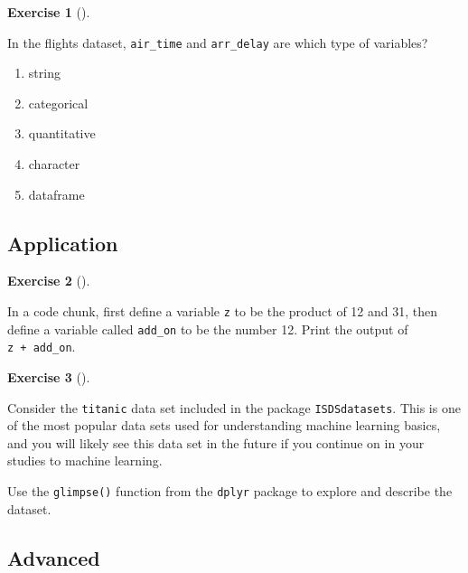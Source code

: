 \documentclass[
  letterpaper,
  DIV=11,
  numbers=noendperiod]{scrreprt}
\providecommand{\tightlist}{%
  \setlength{\itemsep}{0pt}\setlength{\parskip}{0pt}}\usepackage{longtable,booktabs,array}
\theoremstyle{definition}
\newtheorem{exercise}{Exercise}[chapter]
\theoremstyle{remark}
\begin{document}
\begin{exercise}[]\protect\hypertarget{exr-ch01-c08}{}\label{exr-ch01-c08}

In the flights dataset, \texttt{air\_time} and \texttt{arr\_delay} are
which type of variables?

\begin{enumerate}
\def\labelenumi{\alph{enumi})}
\tightlist
\item
  string
\item
  categorical
\item
  quantitative
\item
  character
\item
  dataframe
\end{enumerate}

\end{exercise}

\hypertarget{sec-ex01-application}{%
\subsection{Application}\label{sec-ex01-application}}

\begin{exercise}[]\protect\hypertarget{exr-ch01-app1}{}\label{exr-ch01-app1}

In a code chunk, first define a variable \texttt{z} to be the product of
12 and 31, then define a variable called \texttt{add\_on} to be the
number 12. Print the output of \texttt{z\ +\ add\_on}.

\end{exercise}

\begin{exercise}[]\protect\hypertarget{exr-ch01-app2}{}\label{exr-ch01-app2}

Consider the \texttt{titanic} data set included in the package
\texttt{ISDSdatasets}. This is one of the most popular data sets used
for understanding machine learning basics, and you will likely see this
data set in the future if you continue on in your studies to machine
learning.

Use the \texttt{glimpse()} function from the \texttt{dplyr} package to
explore and describe the dataset.

\end{exercise}

\hypertarget{sec-ex01-advanced}{%
\subsection{Advanced}\label{sec-ex01-advanced}}
\end{document}
